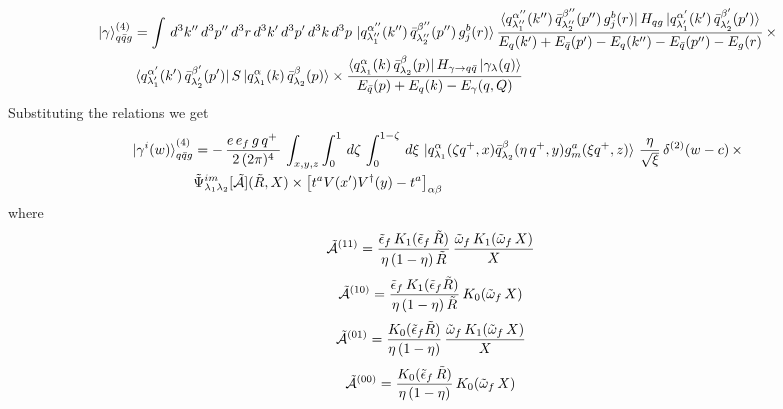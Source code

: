 \documentclass[9pt]{article}
\numberwithin{equation}{section}
\begin{document}
\begin{enumerate}
\begin{align}
    \ket{\gamma}^{(4)}_{q\Bar{q}g} & =  \int\, d^{3}k''\, d^{3}p''\, d^{3}r\, d^{3}k'\, d^{3}p'\, d^{3}k\, d^{3}p\,\ket{q^{\alpha''}_{\lambda''_{1}}(k'')\,\Bar{q}^{\beta''}_{\lambda''_{2}}(p'')\,g^{b}_{j}(r)}\frac{\bra{q^{\alpha''}_{\lambda''_{1}}(k'')\,\Bar{q}^{\beta''}_{\lambda''_{2}}(p'')\,g^{b}_{j}(r)}H_{qg}\ket{q^{\alpha'}_{\lambda'_{1}}(k')\,\Bar{q}^{\beta'}_{\lambda'_{2}}(p')}}{E_{q}(k')+E_{\Bar{q}}(p')-E_{q}(k'')-E_{\Bar{q}}(p'')-E_{g}(r)}\,\times \notag \\ & \bra{q^{\alpha'}_{\lambda'_{1}}(k')\,\Bar{q}^{\beta'}_{\lambda'_{2}}(p')}S\ket{q^{\alpha}_{\lambda_{1}}(k)\,\Bar{q}^{\beta}_{\lambda_{2}}(p)}\times  \frac{\bra{q^{\alpha}_{\lambda_{1}}(k)\,\Bar{q}^{\beta}_{\lambda_{2}}(p)}H_{\gamma\rightarrow q\Bar{q}}\ket{\gamma_{\lambda}(q)}}{E_{\Bar{q}}(p)+E_{q}(k)-E_{\gamma}(q,Q)}
\end{align}
Substituting the relations we get
\begin{align}
    \ket{\gamma^{i}(w)}^{(4)}_{q\Bar{q}g} & = -\,\frac{e\,e_{f}\,g\,q^{+}\,}{2\,(2\pi)^{4}}\, \int_{x,y,z} \int_{0}^{1}\, d\zeta\, \int_{0}^{1-\zeta}\, d\xi\,\ket{q^{\alpha}_{\lambda_{1}}(\zeta q^{+},x)\Bar{q}^{\beta}_{\lambda_{2}}(\eta\,q^{+},y)g^{a}_{m}(\xi q^{+},z)}\, \frac{\eta}{\sqrt{\xi}}\, \delta^{(2)}(w-c)\,\times \notag \\ & \Tilde{\Psi}^{im}_{\lambda_{1}\lambda_{2}}[\mathcal{\Tilde{A}}](\Tilde{R},X)\times \left[t^{a}V(x')V^{\dagger}(y)-t^a\right]_{\alpha\beta}
\end{align}
where 
\begin{align}
    \mathcal{\Tilde{A}}^{(11)} & = \frac{\Tilde{\epsilon}_{f}\,K_{1}(\Tilde{\epsilon}_{f}\,\Tilde{R})}{\eta\,(1-\eta)\,\Tilde{R}}\, \frac{\Tilde{\omega}_{f}\,K_{1}(\Tilde{\omega}_{f}\,X)}{X}
\end{align}
\begin{align}
    \mathcal{\Tilde{A}}^{(10)} & = \frac{\Tilde{\epsilon}_{f}\,K_{1}(\Tilde{\epsilon}_{f}\Tilde{R})}{\eta\,(1-\eta)\,\Tilde{R}}\, K_{0}(\Tilde{\omega}_{f}\,X)
\end{align}
\begin{align}
    \mathcal{\Tilde{A}}^{(01)} & =   \frac{K_{0}(\Tilde{\epsilon}_{f}\Tilde{R})}{\eta\,(1-\eta)}\,\frac{\Tilde{\omega}_{f}\,K_{1}(\Tilde{\omega}_{f}\,X)}{X}
\end{align}
\begin{align}
    \mathcal{\Tilde{A}}^{(00)} & = \frac{K_{0}(\Tilde{\epsilon}_{f}\,\Tilde{R})}{\eta\,(1-\eta)}\, K_{0}(\Tilde{\omega}_{f}\,X)
\end{align}

\end{enumerate}
\end{document}
